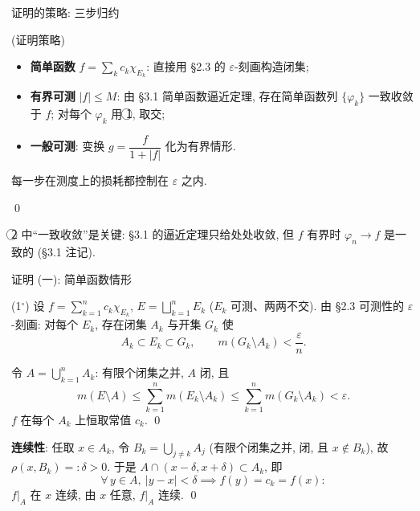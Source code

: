 
\begin{frame}{证明的策略: 三步归约}

\startproof[bg=yellow, fg=red](证明策略)
\begin{itemize}
\item[\textcircled{1}] \textbf{简单函数} $f = \sum_k c_k \chi_{E_k}$: 直接用 \S 2.3 的 $\varepsilon$-刻画构造闭集;
\item[\textcircled{2}] \textbf{有界可测} $|f| \leqslant M$: 由 \S 3.1 简单函数逼近定理, 存在简单函数列
  $\{\varphi_k\}$ \alert{一致收敛}于 $f$; 对每个 $\varphi_k$ 用 \textcircled{1}, 取\alert{交};
\item[\textcircled{3}] \textbf{一般可测}: 变换 $g = \dfrac{f}{1 + |f|}$ 化为有界情形.
\end{itemize}
每一步在测度上的损耗都控制在 $\varepsilon$ 之内.

\qed

\pause

\begin{attnblock}
\textcircled{2} 中``一致收敛''是关键: \S 3.1 的逼近定理只给处处收敛, 但 $f$ \alert{有界}时
$\varphi_n \to f$ 是\alert{一致}的 (\S 3.1 注记).
\end{attnblock}

\end{frame}


\begin{frame}{证明 (一): 简单函数情形}

\startproof[bg=yellow, fg=red](1$^\circ$)
设 $f = \sum_{k=1}^{n} c_k \chi_{E_k}$, $E = \bigsqcup_{k=1}^{n} E_k$ ($E_k$ 可测、两两不交).
由 \S 2.3 可测性的 $\varepsilon$-刻画: 对每个 $E_k$, 存在闭集 $A_k$ 与开集 $G_k$ 使
\[
A_k \subset E_k \subset G_k,
\qquad
m(G_k \setminus A_k) < \frac{\varepsilon}{n}.
\]

\pause

令 $A = \bigcup_{k=1}^{n} A_k$: 有限个闭集之并, $A$ \alert{闭}, 且
\[
m(E \setminus A) \leqslant \sum_{k=1}^{n} m(E_k \setminus A_k)
\leqslant \sum_{k=1}^{n} m(G_k \setminus A_k) < \varepsilon .
\]
$f$ 在每个 $A_k$ 上恒取常值 $c_k$.
\qed

\pause

\textbf{连续性}: 任取 $x \in A_k$, 令 $B_k = \bigcup_{j \neq k} A_j$ (有限个闭集之并, 闭, 且 $x \notin B_k$),
故 $\rho(x, B_k) =: \delta > 0$. 于是 $A \cap (x - \delta, x + \delta) \subset A_k$, 即
\[
\forall\, y \in A,\ |y - x| < \delta \implies f(y) = c_k = f(x):
\]
$f\big|_A$ 在 $x$ 连续, 由 $x$ 任意, $f\big|_A$ 连续.
\qed

\end{frame}

